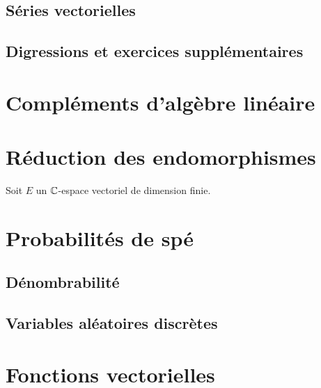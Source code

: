 \documentclass[12pt,a4paper]{exo_book}
\begin{document}
\section{Séries vectorielles}

\section{Digressions et exercices supplémentaires}


\chapter{Compléments d'algèbre linéaire}

\chapter{Réduction des endomorphismes}

\begin{exo}
    Soit $E$ un $\mathbb{C}$-espace vectoriel de dimension finie.
\end{exo}


\chapter{Probabilités de spé}

\section{Dénombrabilité}

\section{Variables aléatoires discrètes}


\chapter{Fonctions vectorielles}
\end{document}
